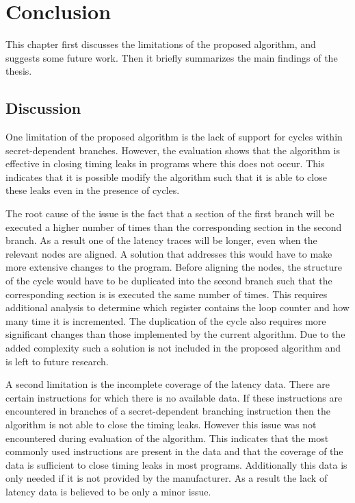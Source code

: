 
\chapter{Conclusion}
\label{cha:conclusion}
This chapter first discusses the limitations of the proposed algorithm, and suggests some future work. Then it briefly summarizes the main findings of the thesis. 

\section{Discussion}
One limitation of the proposed algorithm is the lack of support for cycles within secret-dependent branches.
However, the evaluation shows that the algorithm is effective in closing timing leaks in programs where this does not occur. 
This indicates that it is possible modify the algorithm such that it is able to close these leaks even in the presence of cycles. 

The root cause of the issue is the fact that a section of the first branch will be executed a higher number of times than the corresponding section in the second branch. 
As a result one of the latency traces will be longer, even when the relevant nodes are aligned.
A solution that addresses this would have to make more extensive changes to the program. 
Before aligning the nodes, the structure of the cycle would have to be duplicated into the second branch such that the corresponding section is is executed the same number of times. 
This requires additional analysis to determine which register contains the loop counter and how many time it is incremented. 
The duplication of the cycle also requires more significant changes than those implemented by the current algorithm.
Due to the added complexity such a solution is not included in the proposed algorithm and is left to future research. 

A second limitation is the incomplete coverage of the latency data. There are certain instructions for which there is no available data. 
If these instructions are encountered in branches of  a secret-dependent branching instruction then the algorithm is not able to close the timing leaks. 
However this issue was not encountered during evaluation of the algorithm. 
This indicates that the most commonly used instructions are present in the data and that the coverage of the data is sufficient to close timing leaks in most programs. 
Additionally this data is only needed if it is not provided by the manufacturer. 
As a result the lack of latency data is believed to be only a minor issue.  

